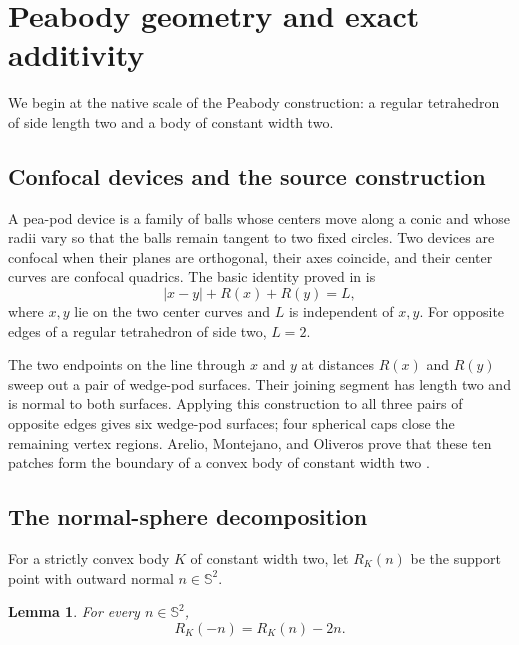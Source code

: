 \documentclass[11pt]{article}
\numberwithin{equation}{section}
\newtheorem{lemma}[theorem]{Lemma}
\theoremstyle{remark}
\newcommand{\Sph}{\mathbb{S}^{2}}
\begin{document}
\section{Peabody geometry and exact additivity}
\label{sec:additivity}

We begin at the native scale of the Peabody construction: a regular tetrahedron of side length two and a body of constant width two.

\subsection{Confocal devices and the source construction}

A pea-pod device is a family of balls whose centers move along a conic and whose radii vary so that the balls remain tangent to two fixed circles. Two devices are confocal when their planes are orthogonal, their axes coincide, and their center curves are confocal quadrics. The basic identity proved in \cite{ArelioMontejanoOliveros2023} is
\begin{equation}
  |x-y|+R(x)+R(y)=L,
  \label{eq:confocal-identity}
\end{equation}
where \(x,y\) lie on the two center curves and \(L\) is independent of \(x,y\). For opposite edges of a regular tetrahedron of side two, \(L=2\).

The two endpoints on the line through \(x\) and \(y\) at distances \(R(x)\) and \(R(y)\) sweep out a pair of wedge-pod surfaces. Their joining segment has length two and is normal to both surfaces. Applying this construction to all three pairs of opposite edges gives six wedge-pod surfaces; four spherical caps close the remaining vertex regions. Arelio, Montejano, and Oliveros prove that these ten patches form the boundary of a convex body of constant width two \cite{ArelioMontejanoOliveros2023}.

\subsection{The normal-sphere decomposition}

For a strictly convex body \(K\) of constant width two, let \(R_K(n)\) be the support point with outward normal \(n\in\Sph\).

\begin{lemma}
\label{lem:opposite}
For every \(n\in\Sph\),
\begin{equation}
  R_K(-n)=R_K(n)-2n.
  \label{eq:opposite-support}
\end{equation}
\end{lemma}
\end{document}
